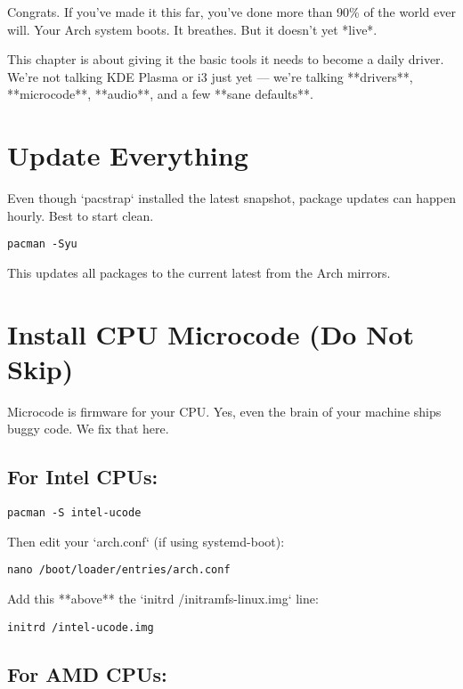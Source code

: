 \documentclass[12pt]{book}
\begin{document}
Congrats. If you’ve made it this far, you’ve done more than 90\% of the world ever will. Your Arch system boots. It breathes. But it doesn’t yet *live*.

This chapter is about giving it the basic tools it needs to become a daily driver. We’re not talking KDE Plasma or i3 just yet — we’re talking **drivers**, **microcode**, **audio**, and a few **sane defaults**.

\section{Update Everything}

Even though `pacstrap` installed the latest snapshot, package updates can happen hourly. Best to start clean.

\begin{lstlisting}
pacman -Syu
\end{lstlisting}

This updates all packages to the current latest from the Arch mirrors.

\section{Install CPU Microcode (Do Not Skip)}

Microcode is firmware for your CPU. Yes, even the brain of your machine ships buggy code. We fix that here.

\subsection*{For Intel CPUs:}

\begin{lstlisting}
pacman -S intel-ucode
\end{lstlisting}

Then edit your `arch.conf` (if using systemd-boot):

\begin{lstlisting}
nano /boot/loader/entries/arch.conf
\end{lstlisting}

Add this **above** the `initrd /initramfs-linux.img` line:

\begin{lstlisting}
initrd /intel-ucode.img
\end{lstlisting}

\subsection*{For AMD CPUs:}
\end{document}
